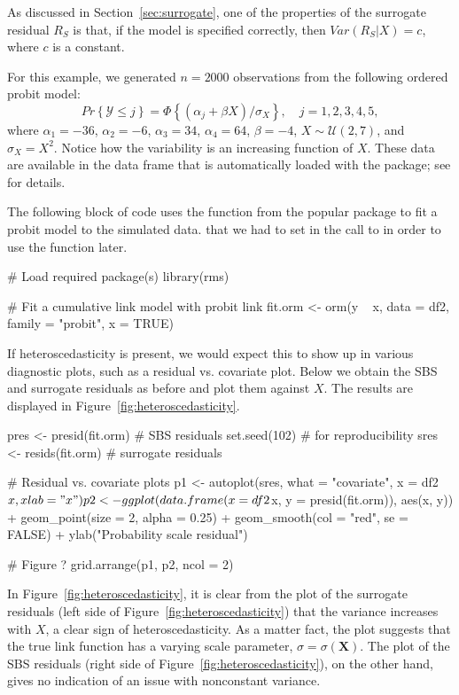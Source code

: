 As discussed in Section~\ref{sec:surrogate}, one of the properties of the surrogate residual $R_S$ is that, if the model is specified correctly, then $Var\left(R_S | X\right) = c$, where $c$ is a constant.

For this example, we generated $n = 2000$ observations from the following ordered probit model:
\begin{equation*}
  Pr\left\{\mathcal{Y} \le j\right\} = \Phi\left\{\left(\alpha_j + \beta X\right) / \sigma_X\right\}, \quad j = 1, 2, 3, 4, 5,
\end{equation*}
where $\alpha_1 = -36$, $\alpha_2 = -6$, $\alpha_3 = 34$, $\alpha_4 = 64$, $\beta = -4$, $X \sim \mathcal{U}\left(2, 7\right)$, and $\sigma_X = X ^ 2$.
Notice how the variability is an increasing function of $X$. These data are available in the  data frame that is automatically loaded with the  package; see  for details.

The following block of code uses the  function from the popular  package to fit a probit model to the simulated data.  that we had to set  in the call to  in order to use the  function later.
\begin{example}
# Load required package(s)
library(rms)

# Fit a cumulative link model with probit link
fit.orm <- orm(y ~ x, data = df2, family = "probit", x = TRUE)
\end{example}

If heteroscedasticity is present, we would expect this to show up in various diagnostic plots, such as a residual vs. covariate plot. Below we obtain the SBS and surrogate residuals as before and plot them against $X$. The results are displayed in Figure~\ref{fig:heteroscedasticity}.
\begin{example}
pres <- presid(fit.orm)  # SBS residuals
set.seed(102)  # for reproducibility
sres <- resids(fit.orm)  # surrogate residuals

# Residual vs. covariate plots
p1 <- autoplot(sres, what = "covariate", x = df2$x, xlab = "x")
p2 <- ggplot(data.frame(x = df2$x, y = presid(fit.orm)), aes(x, y)) +
  geom_point(size = 2, alpha = 0.25) +
  geom_smooth(col = "red", se = FALSE) +
  ylab("Probability scale residual")
  
# Figure ?
grid.arrange(p1, p2, ncol = 2)
\end{example}

In Figure~\ref{fig:heteroscedasticity}, it is clear from the plot of the surrogate residuals (left side of Figure~\ref{fig:heteroscedasticity}) that the variance increases with $X$, a clear sign of heteroscedasticity. As a matter fact, the plot suggests that the true link function has a varying scale parameter, $\sigma = \sigma\left(\boldsymbol{X}\right)$. The plot of the SBS residuals (right side of Figure~\ref{fig:heteroscedasticity}), on the other hand, gives no indication of an issue with nonconstant variance.

